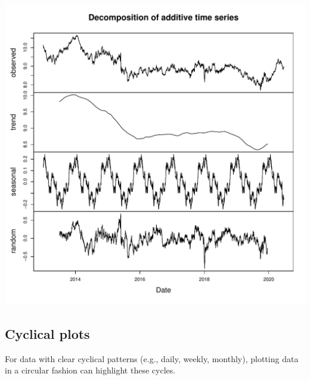 \documentclass{article}\usepackage[]{graphicx}\usepackage[]{xcolor}
\makeatletter
\def\maxwidth{ %
  \ifdim\Gin@nat@width>\linewidth
    \linewidth
  \else
    \Gin@nat@width
  \fi
}
\newenvironment{knitrout}{}{} %
\makeatother
\begin{document}
\begin{knitrout}
\color{fgcolor}
\includegraphics[width=\maxwidth]{figure/unnamed-chunk-3-1} 
\end{knitrout}





\subsection{Cyclical plots}

For data with clear cyclical patterns (e.g., daily, weekly, monthly), plotting data in a circular fashion can highlight these cycles.
\end{document}
